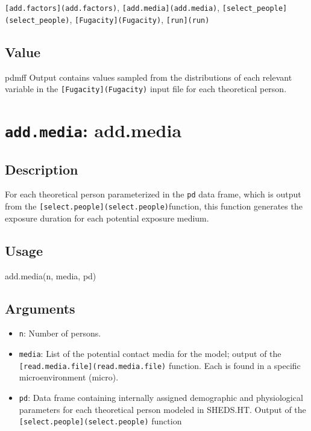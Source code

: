 \documentclass[
]{article}
\newenvironment{Shaded}{\begin{snugshade}}{\end{snugshade}}
\newcommand{\FunctionTok}[1]{\textcolor[rgb]{0.00,0.00,0.00}{#1}}
\newcommand{\NormalTok}[1]{#1}
\providecommand{\tightlist}{%
  \setlength{\itemsep}{0pt}\setlength{\parskip}{0pt}}
\begin{document}
\texttt{{[}add.factors{]}(add.factors)},
\texttt{{[}add.media{]}(add.media)},
\texttt{{[}select\_people{]}(select\_people)},
\texttt{{[}Fugacity{]}(Fugacity)}, \texttt{{[}run{]}(run)}

\hypertarget{value-2}{%
\subsection{Value}\label{value-2}}

pdmff Output contains values sampled from the distributions of each
relevant variable in the \texttt{{[}Fugacity{]}(Fugacity)} input file
for each theoretical person.

\hypertarget{add.media-add.media}{%
\section{\texorpdfstring{\texttt{add.media}:
add.media}{add.media: add.media}}\label{add.media-add.media}}

\hypertarget{description-4}{%
\subsection{Description}\label{description-4}}

For each theoretical person parameterized in the \texttt{pd} data frame,
which is output from the
\texttt{{[}select.people{]}(select.people)}function, this function
generates the exposure duration for each potential exposure medium.

\hypertarget{usage-3}{%
\subsection{Usage}\label{usage-3}}

\begin{Shaded}
\begin{Highlighting}[]
\FunctionTok{add.media}\NormalTok{(n, media, pd)}
\end{Highlighting}
\end{Shaded}

\hypertarget{arguments-3}{%
\subsection{Arguments}\label{arguments-3}}

\begin{itemize}
\tightlist
\item
  \texttt{n}: Number of persons.
\item
  \texttt{media}: List of the potential contact media for the model;
  output of the \texttt{{[}read.media.file{]}(read.media.file)}
  function. Each is found in a specific microenvironment (micro).
\item
  \texttt{pd}: Data frame containing internally assigned demographic and
  physiological parameters for each theoretical person modeled in
  SHEDS.HT. Output of the \texttt{{[}select.people{]}(select.people)}
  function
\end{itemize}
\end{document}
